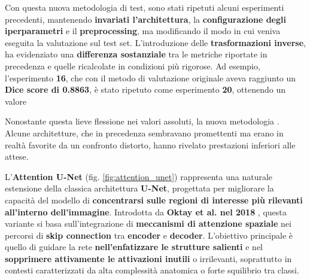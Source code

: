 
Con questa nuova metodologia di test, sono stati ripetuti alcuni esperimenti precedenti, mantenendo \textbf{invariati l’architettura}, la \textbf{configurazione degli iperparametri} e il \textbf{preprocessing}, ma modificando il modo in cui veniva eseguita la valutazione sul test set. L’introduzione delle \textbf{trasformazioni inverse}, ha evidenziato una \textbf{differenza sostanziale} tra le metriche riportate in precedenza e quelle ricalcolate in condizioni più rigorose. Ad esempio, l’esperimento \textbf{16}, che con il metodo di valutazione originale aveva raggiunto un \textbf{Dice score di 0.8863}, è stato ripetuto come esperimento \textbf{20}, ottenendo un valore  

Nonostante questa lieve flessione nei valori assoluti, la nuova metodologia . Alcune architetture, che in precedenza sembravano promettenti ma erano in realtà favorite da un confronto distorto, hanno rivelato prestazioni inferiori alle attese. %


L’\textbf{Attention U-Net} (fig. \ref{fig:attention_unet}) rappresenta una naturale estensione della classica architettura \textbf{U-Net}, progettata per migliorare la capacità del modello di \textbf{concentrarsi sulle regioni di interesse  più rilevanti all’interno dell’immagine}. Introdotta da \textbf{Oktay et al. nel 2018} \cite{oktay2018attention}, questa variante si basa sull’integrazione di \textbf{meccanismi di attenzione spaziale} nei percorsi di \textbf{skip connection} tra \textbf{encoder} e \textbf{decoder}. L’obiettivo principale è quello di guidare la rete \textbf{nell’enfatizzare le strutture salienti} e nel \textbf{sopprimere attivamente le attivazioni inutili} o irrilevanti, soprattutto in contesti caratterizzati da alta complessità anatomica o forte squilibrio tra classi.

